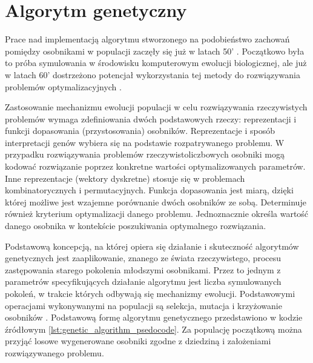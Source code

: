 \section{Algorytm genetyczny}
\label{sec:algorytm_genetyczny}
\par 
Prace nad implementacją algorytmu stworzonego na podobieństwo zachowań pomiędzy osobnikami w populacji zaczęły się już w latach 50' \cite{barker1958simulation}. Początkowo była to próba symulowania w środowisku komputerowym ewolucji biologicznej, ale już w latach 60' dostrzeżono potencjał wykorzystania tej metody do rozwiązywania problemów optymalizacyjnych \cite{bremermann1962optimization}.
\par
Zastosowanie mechanizmu ewolucji populacji w celu rozwiązywania rzeczywistych problemów wymaga zdefiniowania dwóch podstawowych rzeczy: reprezentacji i funkcji dopasowania (przystosowania) osobników. Reprezentacje i sposób interpretacji genów wybiera się na podstawie rozpatrywanego problemu. W przypadku rozwiązywania problemów rzeczywistoliczbowych osobniki mogą kodować rozwiązanie poprzez konkretne wartości optymalizowanych parametrów. Inne reprezentacje (wektory dyskretne) stosuje się w problemach kombinatorycznych i permutacyjnych. Funkcja dopasowania jest miarą, dzięki której możliwe jest wzajemne porównanie dwóch osobników ze sobą. Determinuje również kryterium optymalizacji danego problemu. Jednoznacznie określa wartość danego osobnika w kontekście poszukiwania optymalnego rozwiązania. 
\par
Podstawową koncepcją, na której opiera się działanie i skuteczność algorytmów genetycznych jest zaaplikowanie, znanego ze świata rzeczywistego, procesu zastępowania starego pokolenia młodszymi osobnikami. Przez to jednym z parametrów specyfikujących działanie algorytmu jest liczba symulowanych pokoleń, w trakcie których odbywają się mechanizmy ewolucji. Podstawowymi operacjami wykonywanymi na populacji są selekcja, mutacja i krzyżowanie osobników \cite{sudholt2008computational}. Podstawową formę algorytmu genetycznego przedstawiono w kodzie źródłowym \ref{lst:genetic_algorithm_psedocode}. Za populację początkową można przyjąć losowe wygenerowane osobniki zgodne z dziedziną i założeniami rozwiązywanego problemu.
